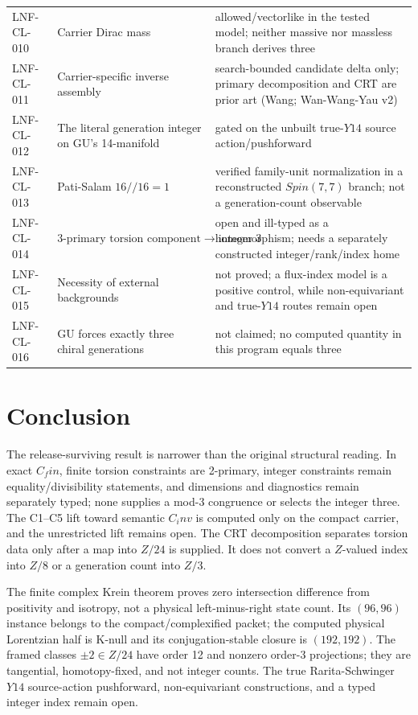 \documentclass[11pt]{article}
\theoremstyle{remark}
\begin{document}
{\begin{longtable}{P{0.14\textwidth}P{0.34\textwidth}P{0.43\textwidth}}
LNF-CL-010 & Carrier Dirac mass & allowed/vectorlike in the tested model; neither massive nor massless branch derives three \\
LNF-CL-011 & Carrier-specific inverse assembly & search-bounded candidate delta only; primary decomposition and CRT are prior art (Wang; Wan-Wang-Yau v2) \\
LNF-CL-012 & The literal generation integer on GU's 14-manifold & gated on the unbuilt true-$Y14$ source action/pushforward \\
LNF-CL-013 & Pati-Salam $16 // 16 = 1$ & verified family-unit normalization in a reconstructed $Spin(7,7)$ branch; not a generation-count observable \\
LNF-CL-014 & $3\text{-primary torsion component}\to\text{integer }3$ & open and ill-typed as a homomorphism; needs a separately constructed integer/rank/index home \\
LNF-CL-015 & Necessity of external backgrounds & not proved; a flux-index model is a positive control, while non-equivariant and true-$Y14$ routes remain open \\
LNF-CL-016 & GU forces exactly three chiral generations & not claimed; no computed quantity in this program equals three \\
\bottomrule
\end{longtable}
}
\section{Conclusion}
The release-surviving result is narrower than the original structural reading. In exact $C_fin$, finite torsion constraints are 2-primary, integer constraints remain equality/divisibility statements, and dimensions and diagnostics remain separately typed; none supplies a mod-3 congruence or selects the integer three. The C1--C5 lift toward semantic $C_inv$ is computed only on the compact carrier, and the unrestricted lift remains open. The CRT decomposition separates torsion data only after a map into $Z/24$ is supplied. It does not convert a $Z$-valued index into $Z/8$ or a generation count into $Z/3$.

The finite complex Krein theorem proves zero intersection difference from positivity and isotropy, not a physical left-minus-right state count. Its $(96,96)$ instance belongs to the compact/complexified packet; the computed physical Lorentzian half is K-null and its conjugation-stable closure is $(192,192)$. The framed classes $\pm2 \in Z/24$ have order 12 and nonzero order-3 projections; they are tangential, homotopy-fixed, and not integer counts. The true Rarita-Schwinger $Y14$ source-action pushforward, non-equivariant constructions, and a typed integer index remain open.
\end{document}
